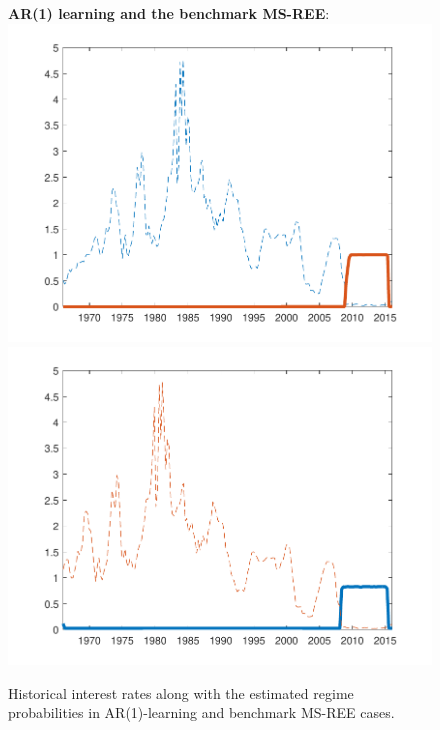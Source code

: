 \documentclass[12pt,reqno]{article}
\numberwithin{equation}{section}
\begin{document}
\begin{figure}[H]
\label{nkpc_regime_prob}
\caption{Historical interest rates along with the estimated regime probabilities in AR(1)-learning and benchmark MS-REE cases. }
\textbf{AR(1) learning and the benchmark MS-REE}:\\

\includegraphics[scale=0.6]{NKPC_ree_init_AR1_regime.pdf} 
\includegraphics[scale=0.6]{NKPC_sigmaPoint_regime.pdf}\\ 





\end{figure}
\end{document}
